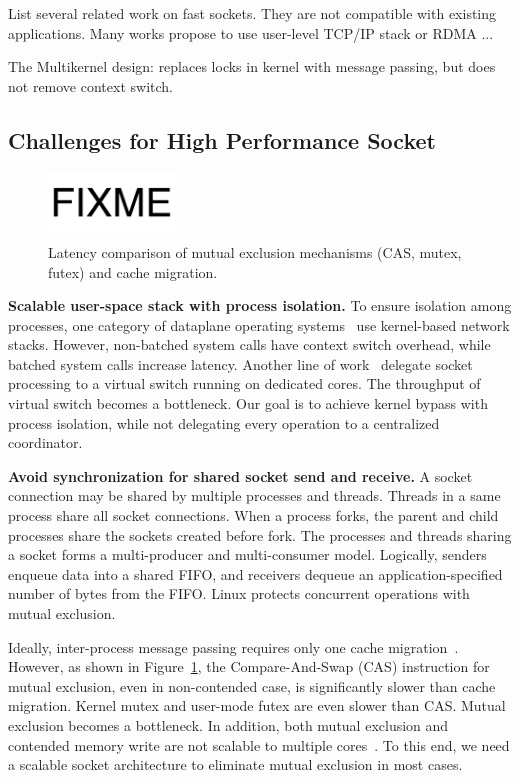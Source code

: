 List several related work on fast sockets. They are not compatible with existing applications. Many works propose to use user-level TCP/IP stack  or RDMA ...

The Multikernel design: replaces locks in kernel with message passing, but does not remove context switch.


\subsection{Challenges for High Performance Socket}
\label{subsec:challenges}

\begin{figure}[t]
	\centering
	\includegraphics[width=0.3\textwidth]{images/fixme}
	\caption{Latency comparison of mutual exclusion mechanisms (CAS, mutex, futex) and cache migration.}
	\label{fig:mutual-exclusion}
\end{figure}

\textbf{Scalable user-space stack with process isolation.}
To ensure isolation among processes, one category of dataplane operating systems~\cite{belay2014ix,tsai2017lite} use kernel-based network stacks. However, non-batched system calls have context switch overhead, while batched system calls increase latency. Another line of work~\cite{martins2014clickos,roghanchi2017ffwd,huang2017high} delegate socket processing to a virtual switch running on dedicated cores. The throughput of virtual switch becomes a bottleneck. Our goal is to achieve kernel bypass with process isolation, while not delegating every operation to a centralized coordinator.

\textbf{Avoid synchronization for shared socket send and receive.}
A socket connection may be shared by multiple processes and threads. Threads in a same process share all socket connections. When a process forks, the parent and child processes share the sockets created before fork. The processes and threads sharing a socket forms a multi-producer and multi-consumer model. Logically, senders enqueue data into a shared FIFO, and receivers dequeue an application-specified number of bytes from the FIFO. Linux protects concurrent operations with mutual exclusion.

Ideally, inter-process message passing requires only one cache migration~\cite{roghanchi2017ffwd}. However, as shown in Figure~\ref{fig:mutual-exclusion}, the Compare-And-Swap (CAS) instruction for mutual exclusion, even in non-contended case, is significantly slower than cache migration. Kernel mutex and user-mode futex are even slower than CAS. Mutual exclusion becomes a bottleneck. In addition, both mutual exclusion and contended memory write are not scalable to multiple cores~\cite{boyd2014optimizing}. To this end, we need a scalable socket architecture to eliminate mutual exclusion in most cases.

